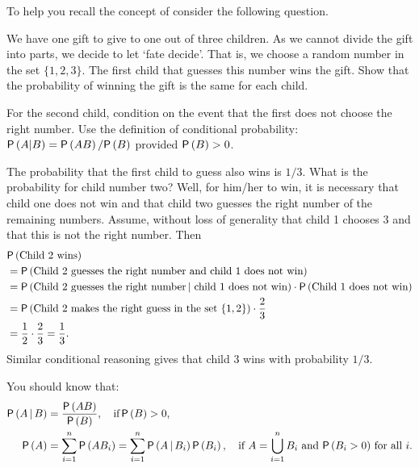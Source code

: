 \documentclass[companion.tex]{subfiles}
\begin{document}
To help you recall the concept of  consider the following question.
\begin{exercise}
 We have one gift to give to one out of three children. As we cannot
 divide the gift into parts, we decide to let `fate decide'. That
 is, we choose a random number in the set $\{1, 2, 3\}$. The first
 child that guesses this number wins the gift. Show that the
 probability of winning the gift is the same for each child.
\begin{hint}
 For the second child, condition on the event that the first does not choose the right number.
 Use the definition of conditional probability:
 $\P{A|B} = \P{AB}/\P{B}$ provided $\P{B}>0$.
\end{hint}
\begin{solution}
 The probability that the first child to guess also wins is
 $1/3$. What is the probability for child number two? Well, for
 him/her to win, it is necessary that child one does not win and
 that child two guesses the right number of the remaining
 numbers. Assume, without loss of generality that child 1 chooses
 $3$ and that this is not the right number. Then 
 \begin{equation*}
 \begin{split}
&\P{\text{Child 2 wins}} \\
&= \P{\text{Child 2 guesses the right number and child 1 does not win}} \\
&= \P{\text{Child 2 guesses the right number} \given\, \text{child 1 does not win}}
\cdot \P{\text{Child 1 does not win}} \\
&= \P{\text{Child 2 makes the right guess in the set $\{1,2\}$}}\cdot \frac 23 \\
&= \frac 1 2\cdot \frac 23 = \frac 1 3.
 \end{split}
 \end{equation*}
 Similar conditional reasoning gives that child 3 wins with probability $1/3$. 
\end{solution}
\end{exercise}

You should know that:
\begin{subequations}
\begin{align}
\P{A\given B} & = \frac{\P{AB}}{\P{B}}, \quad\text{if}\, \P{B}>0, \\
 \P{A} &= \sum_{i=1}^n \P{A B_i} = \sum_{i=1}^n \P{A\given B_i} \P{B_i}, \quad\text{if $A=\bigcup_{i=1}^n B_i$ and $\P{B_i>0}$ for all $i$}. \label{eq:70}
\end{align}
\end{subequations}


\end{document}
